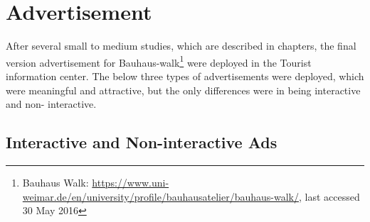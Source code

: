 \section{Advertisement}
After several small to medium studies, which are described in \pageref{Chapter4, Chapter5 and Chapter6} chapters, the final version advertisement for Bauhaus-walk\footnote{Bauhaus Walk: \url{https://www.uni-weimar.de/en/university/profile/bauhausatelier/bauhaus-walk/}, last accessed 30 May 2016} were deployed in the Tourist information center. The below three types of advertisements were deployed, which were meaningful and attractive, but the only differences were in being interactive and non- interactive.




\subsection{Interactive and Non-interactive Ads}

